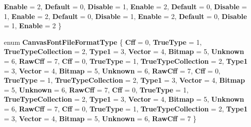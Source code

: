 \begin{DoxyCompactItemize}
{\bfseries Enable} = 2, 
{\bfseries Default} = 0, 
\newline
{\bfseries Disable} = 1, 
{\bfseries Enable} = 2, 
{\bfseries Default} = 0, 
{\bfseries Disable} = 1, 
\newline
{\bfseries Enable} = 2, 
{\bfseries Default} = 0, 
{\bfseries Disable} = 1, 
{\bfseries Enable} = 2, 
\newline
{\bfseries Default} = 0, 
{\bfseries Disable} = 1, 
{\bfseries Enable} = 2
 \}
\item 
\mbox{\label{namespace_microsoft_1_1_graphics_1_1_canvas_1_1_text_a70ea121d1ef956464e4adf30172f2a87}} 
enum {\bfseries Canvas\+Font\+File\+Format\+Type} \{ \newline
{\bfseries Cff} = 0, 
{\bfseries True\+Type} = 1, 
{\bfseries True\+Type\+Collection} = 2, 
{\bfseries Type1} = 3, 
\newline
{\bfseries Vector} = 4, 
{\bfseries Bitmap} = 5, 
{\bfseries Unknown} = 6, 
{\bfseries Raw\+Cff} = 7, 
\newline
{\bfseries Cff} = 0, 
{\bfseries True\+Type} = 1, 
{\bfseries True\+Type\+Collection} = 2, 
{\bfseries Type1} = 3, 
\newline
{\bfseries Vector} = 4, 
{\bfseries Bitmap} = 5, 
{\bfseries Unknown} = 6, 
{\bfseries Raw\+Cff} = 7, 
\newline
{\bfseries Cff} = 0, 
{\bfseries True\+Type} = 1, 
{\bfseries True\+Type\+Collection} = 2, 
{\bfseries Type1} = 3, 
\newline
{\bfseries Vector} = 4, 
{\bfseries Bitmap} = 5, 
{\bfseries Unknown} = 6, 
{\bfseries Raw\+Cff} = 7, 
\newline
{\bfseries Cff} = 0, 
{\bfseries True\+Type} = 1, 
{\bfseries True\+Type\+Collection} = 2, 
{\bfseries Type1} = 3, 
\newline
{\bfseries Vector} = 4, 
{\bfseries Bitmap} = 5, 
{\bfseries Unknown} = 6, 
{\bfseries Raw\+Cff} = 7, 
\newline
{\bfseries Cff} = 0, 
{\bfseries True\+Type} = 1, 
{\bfseries True\+Type\+Collection} = 2, 
{\bfseries Type1} = 3, 
\newline
{\bfseries Vector} = 4, 
{\bfseries Bitmap} = 5, 
{\bfseries Unknown} = 6, 
{\bfseries Raw\+Cff} = 7
 \}
\item 
\mbox{\label{namespace_microsoft_1_1_graphics_1_1_canvas_1_1_text_a2a86f72637a3f77480105b5a22f96b31}} 

\end{DoxyCompactItemize}
